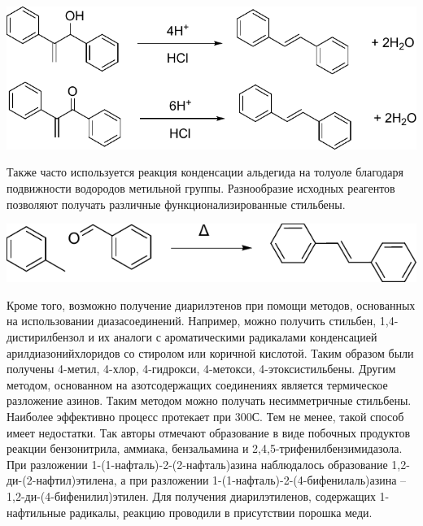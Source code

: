 			\begin{scheme}
				\includegraphics{Dissertation/images/part1/Stylbenes}	
			\end{scheme}
			
			Также часто используется реакция конденсации альдегида на толуоле благодаря подвижности водородов метильной группы. \cite{Wood1941} Разнообразие исходных реагентов позволяют получать различные функционализированные стильбены. 
			
			\begin{scheme}
				\includegraphics{Dissertation/images/part1/Stylbenes2}	
			\end{scheme}
		
			Кроме того, возможно получение диарилэтенов при помощи методов, основанных на использовании диазасоединений.\cite{Krasovitsky_Bolotin} Например, можно получить стильбен, 1,4-дистирилбензол и их аналоги с ароматическими радикалами конденсацией арилдиазонийхлоридов   со стиролом или коричной кислотой. Таким образом были получены 4-метил, 4-хлор, 4-гидрокси, 4-метокси, 4-этоксистильбены. \cite{Scintilators} Другим методом, основанном на азотсодержащих соединениях является термическое разложение азинов. \cite{Malkes1962_5} Таким методом можно получать несимметричные стильбены. Наиболее эффективно процесс протекает при 300\textdegree{}С. Тем не менее, такой способ имеет недостатки. Так авторы отмечают образование в виде побочных продуктов реакции бензонитрила, аммиака, бензальамина и 2,4,5-трифенилбензимидазола. При разложении 1-(1-нафталь)-2-(2-нафталь)азина наблюдалось образование 1,2-ди-(2-нафтил)этилена, а при разложении 1-(1-нафталь)-2-(4-бифенилаль)азина -- 1,2-ди-(4-бифенилил)этилен. Для получения диарилэтиленов, содержащих 1-нафтильные радикалы, реакцию проводили в присутствии порошка меди.\cite{Malkes1962_1}
			
